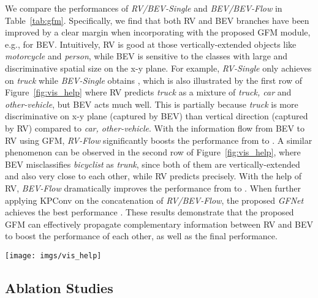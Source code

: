 We compare the performances of \textit{RV/BEV-Single} and \textit{BEV/BEV-Flow} in Table~\ref{tab:gfm}. Specifically, we find that both RV and BEV branches have been improved by a clear margin when incorporating with the proposed GFM module, e.g.,  for BEV. Intuitively, RV is good at those vertically-extended objects like \textit{motorcycle} and \textit{person}, while BEV is sensitive to the classes with large and discriminative spatial size on the x-y plane. For example, \textit{RV-Single} only achieves  on \textit{truck} while \textit{BEV-Single} obtains , which is also illustrated by the first row of Figure~\ref{fig:vis_help} where RV predicts \textit{truck} as a mixture of \textit{truck, car} and \textit{other-vehicle}, but BEV acts much well. This is partially because \textit{truck} is more discriminative on x-y plane (captured by BEV) than vertical direction (captured by RV) compared to \textit{car, other-vehicle}. With the information flow from BEV to RV using GFM, \textit{RV-Flow} significantly boosts the performance from  to . A similar phenomenon can be observed in the second row of Figure~\ref{fig:vis_help}, where BEV misclassifies \textit{bicyclist} as \textit{trunk}, since both of them are vertically-extended and also very close to each other, while RV predicts precisely. With the help of RV, \textit{BEV-Flow} dramatically improves the performance from  to . When further applying KPConv on the concatenation of \textit{RV/BEV-Flow}, the proposed \textit{GFNet} achieves the best performance . These results demonstrate that the proposed GFM can effectively propagate complementary information between RV and BEV to boost the performance of each other, as well as the final performance.

\begin{figure*}[t]
    \centering
    \texttt{[image: imgs/vis\_help]}
    \caption{Visualization of RV and BEV. The view with the cyan contour helps the one with red. By incorporating both RV and BEV, our GFNet makes more accurate predictions. 
    }
    \label{fig:vis_help}
\end{figure*}






\subsection{Ablation Studies}
\label{sec:ablation}

